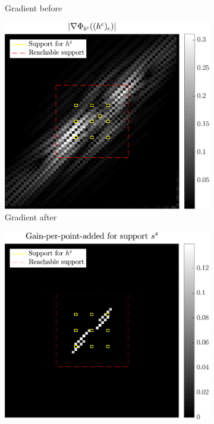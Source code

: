 \begin{figure}[!ht]
\begin{subfigure}[b]{0.32\linewidth}
\caption{Gradient before} \label{fig_grad_before}
\end{subfigure}
\begin{subfigure}[b]{0.32\linewidth}\centering
\includegraphics[width=\linewidth]{figures/before_after/xp_128x128_sc2_angl1_K3_S3_node4after_partgrad4.pdf}
\caption{Gradient after} \label{fig_grad_after}
\end{subfigure}
\begin{subfigure}[b]{0.32\linewidth}\centering
\includegraphics[width=\linewidth]{figures/before_after/xp_128x128_sc2_angl1_K3_S3_node4before_objmatrix_bestvalues.pdf}

\end{subfigure}
\end{figure}
